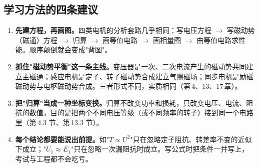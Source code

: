 \subsection*{学习方法的四条建议}
\begin{enumerate}
  \item \textbf{先建方程，再画图。}四类电机的分析套路几乎相同：写电压方程 $\rightarrow$ 写磁动势（磁通）方程 $\rightarrow$ 归算 $\rightarrow$ 画等值电路 $\rightarrow$ 画相量图 $\rightarrow$ 由等值电路求性能。顺序颠倒就会变成"背图"。
  \item \textbf{抓住"磁动势平衡"这一条主线。}变压器是一次、二次电流产生的磁动势共同建立主磁通；感应电机是定子、转子磁动势合成建立气隙磁场；同步电机是励磁磁动势与电枢磁动势合成。三者形式不同，实质相同（第\,4、13、17\,章）。
  \item \textbf{把"归算"当成一种坐标变换。}归算不改变功率和损耗，只改变电压、电流、阻抗的数值，目的是把两个不同电压等级（或不同频率的转子）接到同一个电路里（第\,4.3 节、第\,13.3 节）。
  \item \textbf{每个结论都要能说出前提。}如"$T \propto U^2$"只在忽略定子阻抗、转差率不变的近似下成立；"$U_1\approx E_1$"只在忽略一次漏阻抗时成立。写公式时把条件一并写上，考试与工程都不会吃亏。
\end{enumerate}

